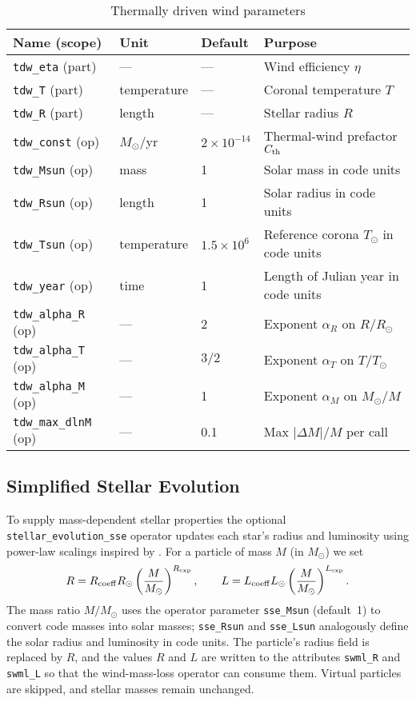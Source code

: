\documentclass[11pt]{article}
\begin{document}
\begin{table}[h]
\centering\footnotesize
\caption{Thermally driven wind parameters}
\label{tab:tdw}
\begin{tabular}{@{}llll@{}}
\toprule
Name (scope) & Unit & Default & Purpose \\
\midrule
\texttt{tdw\_eta} (part) & — & — & Wind efficiency $\eta$\\
\texttt{tdw\_T}   (part) & temperature & — & Coronal temperature $T$\\
\texttt{tdw\_R}   (part) & length & — & Stellar radius $R$\\[0.2em]
\texttt{tdw\_const} (op) & $M_\odot$/yr & $2\times10^{-14}$ & Thermal-wind prefactor $C_{\rm th}$\\
\texttt{tdw\_Msun}  (op) & mass & 1 & Solar mass in code units\\
\texttt{tdw\_Rsun}  (op) & length & 1 & Solar radius in code units\\
\texttt{tdw\_Tsun}  (op) & temperature & $1.5\times10^6$ & Reference corona $T_\odot$ in code units\\
\texttt{tdw\_year}  (op) & time & 1 & Length of Julian year in code units\\
\texttt{tdw\_alpha\_R} (op) & — & 2 & Exponent $\alpha_R$ on $R/R_\odot$\\
\texttt{tdw\_alpha\_T} (op) & — & $3/2$ & Exponent $\alpha_T$ on $T/T_\odot$\\
\texttt{tdw\_alpha\_M} (op) & — & 1 & Exponent $\alpha_M$ on $M_\odot/M$\\
\texttt{tdw\_max\_dlnM} (op) & — & 0.1 & Max $|\Delta M|/M$ per call\\
\bottomrule
\end{tabular}
\end{table}

\subsection{Simplified Stellar Evolution}
\label{sec:sse}

To supply mass-dependent stellar properties the optional
\texttt{stellar\_evolution\_sse} operator updates each star's radius and
luminosity using power-law scalings inspired by \citet{Hurley2000}. For a
particle of mass $M$ (in $M_\odot$) we set
\[
R = R_{\rm coeff} R_\odot \left(\frac{M}{M_\odot}\right)^{R_{\rm exp}},\qquad
L = L_{\rm coeff} L_\odot \left(\frac{M}{M_\odot}\right)^{L_{\rm exp}}.
\]
The mass ratio $M/M_\odot$ uses the operator parameter
\texttt{sse\_Msun} (default 1) to convert code masses into solar masses;
\texttt{sse\_Rsun} and \texttt{sse\_Lsun} analogously define the solar radius
and luminosity in code units.  The particle's radius field is replaced by $R$,
and the values $R$ and $L$ are written to the attributes
\texttt{swml\_R} and \texttt{swml\_L} so that the wind-mass-loss operator can
consume them. Virtual particles are skipped, and stellar masses remain
unchanged.
\end{document}

